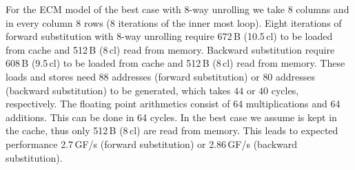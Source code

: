 For the ECM model of the best case with 8-way unrolling we take 8 columns and in every column 8 rows (8 iterations of the inner most loop).
Eight iterations of forward substitution with 8-way unrolling require 672\,B (10.5\,cl) to be loaded from cache and 512\,B (8\,cl) read from memory.
Backward substitution require 608\,B (9.5\,cl) to be loaded from cache and 512\,B (8\,cl) read from memory.
These loads and stores need $88$ addresses (forward substitution) or $80$ addresses (backward substitution) to be generated, which takes $44$ or $40$ cycles, respectively.
The floating point arithmetics consist of 64 multiplications and 64 additions. This can be done in 64 cycles.
In the best case we assume \vindx{} is kept in the cache, thus only 512\,B (8\,cl) are read from memory.
This leads to expected performance 2.7\,GF/s (forward substitution) or 2.86\,GF/s (backward substitution).


